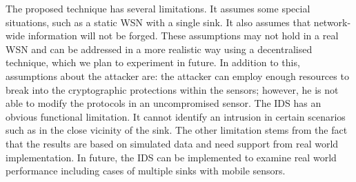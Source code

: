 \documentclass{CRPITStyle}
\begin{document}
The proposed technique has several limitations. 
It assumes some special situations, such as a static WSN with a single sink.
It also assumes that network-wide information will not be forged. %
These assumptions may not hold in a real WSN and can be addressed in a more realistic way using a decentralised technique, which we plan to experiment in future.
In addition to this, assumptions about the attacker are: the attacker can employ enough resources to break into the cryptographic protections within the sensors; however, he is not able to modify the protocols in an uncompromised sensor.
The IDS has an obvious functional limitation.
It cannot identify an intrusion in certain scenarios such as 
in the close vicinity of the sink.%
The other limitation stems from the fact that the results are based on simulated data and need support from real world implementation.
In future,  the IDS can be implemented to examine real world performance including cases of multiple sinks with mobile sensors.






\end{document}

